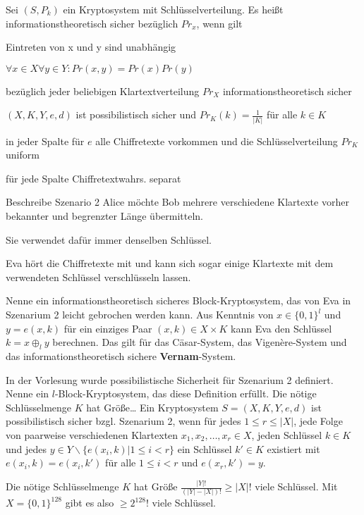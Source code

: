 \documentclass[avery5371, frame]{flashcards}
\begin{document}
\begin{flashcard}[Kryptosysteme]{Sei $(S,P_k)$ ein Kryptosystem mit Schlüsselverteilung. Es heißt informationstheoretisch sicher bezüglich $Pr_x$, wenn gilt}
    \begin{itemize*}
        \item Eintreten von x und y sind unabhängig
        \item $\forall x\in X \forall y\in Y: Pr(x,y)=Pr(x)Pr(y)$
        \item bezüglich jeder beliebigen Klartextverteilung $Pr_X$ informationstheoretisch sicher
        \item $(X,K,Y,e,d)$ ist possibilistisch sicher und $Pr_K(k)=\frac{1}{|K|}$ für alle $k\in K$
        \item in jeder Spalte für $e$ alle Chiffretexte vorkommen und die Schlüsselverteilung $Pr_K$ uniform
        \item für jede Spalte Chiffretextwahrs. separat
    \end{itemize*}
\end{flashcard}

\begin{flashcard}{Beschreibe Szenario 2}
    Alice möchte Bob mehrere verschiedene Klartexte vorher bekannter und begrenzter Länge übermitteln.

    Sie verwendet dafür immer denselben Schlüssel.

    Eva hört die Chiffretexte mit und kann sich sogar einige Klartexte mit dem verwendeten Schlüssel verschlüsseln lassen.
\end{flashcard}

\begin{flashcard}{Nenne ein informationstheoretisch sicheres Block-Kryptosystem, das von Eva in Szenarium 2 leicht gebrochen werden kann.}
    Aus Kenntnis von $x\in\{0,1\}^l$ und $y=e(x,k)$ für ein einziges Paar $(x,k)\in X\times K$ kann Eva den Schlüssel $k=x\oplus_l y$ berechnen. Das gilt für das Cäsar-System, das Vigenère-System und das informationstheoretisch sichere \textbf{Vernam}-System.
\end{flashcard}

\begin{flashcard}{In der Vorlesung wurde possibilistische Sicherheit für Szenarium 2 definiert. Nenne ein $l$-Block-Kryptosystem, das diese Definition erfüllt. Die nötige Schlüsselmenge $K$ hat Größe\dots}
    Ein Kryptosystem $S=(X,K,Y,e,d)$ ist possibilistisch sicher bzgl. Szenarium 2, wenn für jedes $1 \leq r\leq |X|$, jede Folge von paarweise verschiedenen Klartexten $x_1,x_2,\dots,x_r\in X$, jeden Schlüssel $k\in K$ und jedes $y\in Y\backslash\{e(x_i,k)| 1 \leq i < r\}$ ein Schlüssel $k'\in K$ existiert mit $e(x_i,k)=e(x_i,k')$ für alle $1\leq i< r$ und $e(x_r,k')=y$.

    Die nötige Schlüsselmenge $K$ hat Größe $\frac{|Y|!}{(|Y|-|X|)!} \geq |X|!$ viele Schlüssel.
    Mit $X=\{0,1\}^{128}$  gibt es also $\geq 2^{128}!$ viele Schlüssel.
\end{flashcard}
\end{document}
